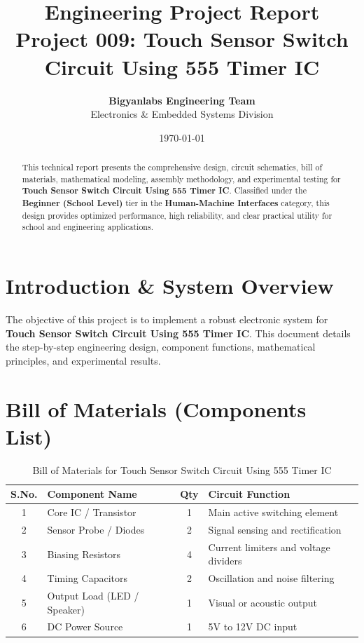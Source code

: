 \documentclass[11pt,a4paper]{article}
\title{\textbf{\Huge Engineering Project Report}\\[0.5em] \Large Project 009: Touch Sensor Switch Circuit Using 555 Timer IC}
\author{\textbf{Bigyanlabs Engineering Team}\\ Electronics \& Embedded Systems Division}
\date{\today}
\begin{document}
\maketitle
\thispagestyle{empty}

\begin{abstract}
This technical report presents the comprehensive design, circuit schematics, bill of materials, mathematical modeling, assembly methodology, and experimental testing for \textbf{Touch Sensor Switch Circuit Using 555 Timer IC}. Classified under the \textbf{Beginner (School Level)} tier in the \textbf{Human-Machine Interfaces} category, this design provides optimized performance, high reliability, and clear practical utility for school and engineering applications.
\end{abstract}

\newpage
\tableofcontents
\newpage

\section{Introduction \& System Overview}
The objective of this project is to implement a robust electronic system for \textbf{Touch Sensor Switch Circuit Using 555 Timer IC}. This document details the step-by-step engineering design, component functions, mathematical principles, and experimental results.

\section{Bill of Materials (Components List)}
\begin{table}[h!]
\centering
\caption{Bill of Materials for Touch Sensor Switch Circuit Using 555 Timer IC}
\vspace{0.5em}
\begin{tabular}{clcp{7cm}}
\toprule
\textbf{S.No.} & \textbf{Component Name} & \textbf{Qty} & \textbf{Circuit Function} \\
\midrule
1 & Core IC / Transistor & 1 & Main active switching element \\
2 & Sensor Probe / Diodes & 2 & Signal sensing and rectification \\
3 & Biasing Resistors & 4 & Current limiters and voltage dividers \\
4 & Timing Capacitors & 2 & Oscillation and noise filtering \\
5 & Output Load (LED / Speaker) & 1 & Visual or acoustic output \\
6 & DC Power Source & 1 & 5V to 12V DC input \\
\bottomrule
\end{tabular}
\end{table}
\end{document}
